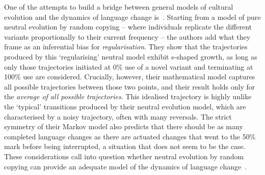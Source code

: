 One of the attempts to build a bridge between general models of cultural evolution and the dynamics of language change is~\citet{Reali2010}. Starting from a model of pure neutral evolution by random copying -- where individuals replicate the different variants proportionally to their current frequency -- the authors add what they frame as an inferential bias for \emph{regularisation}. %
They show that the trajectories produced by this `regularising' neutral model exhibit s-shaped growth, as long as only those trajectories initiated at 0\% use of a novel variant and terminating at 100\% use are considered. Crucially, however, their mathematical model captures all possible trajectories between those two points, and their result holds only for the \emph{average of all possible trajectories}. This idealised trajectory is highly unlike the `typical' transitions produced by their neutral evolution model, which are characterised by a noisy trajectory, often with many reversals. The strict symmetry of their Markov model also predicts that there should be as many completed language changes as there are actuated changes that went to the 50\% mark before being interrupted, a situation that does not seem to be the case. These considerations call into question whether neutral evolution by random copying can provide an adequate model of the dynamics of language change~\citep{Blythe2012neutral}.

